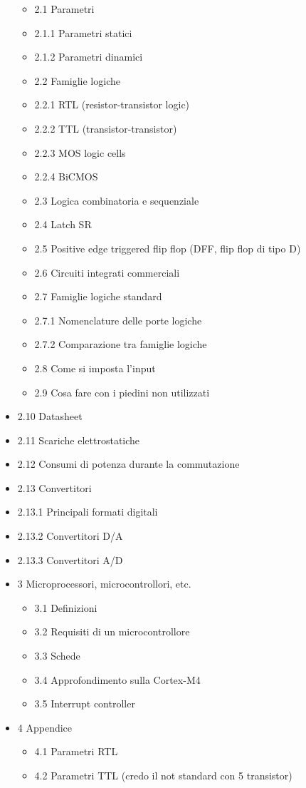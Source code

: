\documentclass[
]{article}
\providecommand{\tightlist}{%
  \setlength{\itemsep}{0pt}\setlength{\parskip}{0pt}}
\begin{document}
\begin{itemize}
  \begin{itemize}
  \tightlist
  \item
    2.1 Parametri
  \item
    2.1.1 Parametri statici
  \item
    2.1.2 Parametri dinamici
  \item
    2.2 Famiglie logiche
  \item
    2.2.1 RTL (resistor-transistor logic)
  \item
    2.2.2 TTL (transistor-transistor)
  \item
    2.2.3 MOS logic cells
  \item
    2.2.4 BiCMOS
  \item
    2.3 Logica combinatoria e sequenziale
  \item
    2.4 Latch SR
  \item
    2.5 Positive edge triggered flip flop (DFF, flip flop di tipo D)
  \item
    2.6 Circuiti integrati commerciali
  \item
    2.7 Famiglie logiche standard
  \item
    2.7.1 Nomenclature delle porte logiche
  \item
    2.7.2 Comparazione tra famiglie logiche
  \item
    2.8 Come si imposta l'input
  \item
    2.9 Cosa fare con i piedini non utilizzati
  \end{itemize}
\item
  2.10 Datasheet
\item
  2.11 Scariche elettrostatiche
\item
  2.12 Consumi di potenza durante la commutazione
\item
  2.13 Convertitori
\item
  2.13.1 Principali formati digitali
\item
  2.13.2 Convertitori D/A
\item
  2.13.3 Convertitori A/D
\item
  3 Microprocessori, microcontrollori, etc.

  \begin{itemize}
  \tightlist
  \item
    3.1 Definizioni
  \item
    3.2 Requisiti di un microcontrollore
  \item
    3.3 Schede
  \item
    3.4 Approfondimento sulla Cortex-M4
  \item
    3.5 Interrupt controller
  \end{itemize}
\item
  4 Appendice

  \begin{itemize}
  \tightlist
  \item
    4.1 Parametri RTL
  \item
    4.2 Parametri TTL (credo il not standard con 5 transistor)
  \end{itemize}
\end{itemize}
\end{document}
